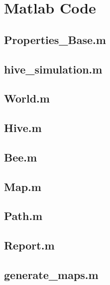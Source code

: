 \section{Matlab Code}
\label{chap:MATLAB_Code}
\subsection{Properties\_Base.m}
\label{chap:MATLAB_Base}

\subsection{hive\_simulation.m}
\label{chap:MATLAB_hive_simulation}

\subsection{World.m}
\label{chap:MATLAB_World}

\subsection{Hive.m}
\label{chap:MATLAB_Hive}

\subsection{Bee.m}
\label{chap:MATLAB_Bee}

\subsection{Map.m}
\label{chap:MATLAB_Map}

\subsection{Path.m}
\label{chap:MATLAB_Path}

\subsection{Report.m}
\label{chap:MATLAB_Report}

\subsection{generate\_maps.m}
\label{chap:MATLAB_generate_maps}

